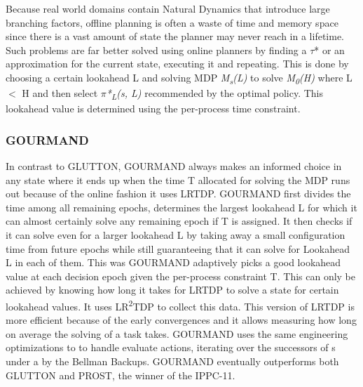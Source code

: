 \documentclass[runningheads,a4paper]{llncs}
\begin{document}
Because real world domains contain Natural Dynamics that introduce large branching factors, offline planning is often a waste of time and memory space since there is a vast amount of state the planner may never reach in a lifetime. Such problems are far better solved using online planners by finding a $\tau$* or an approximation for the current state, executing it and repeating. This is done by choosing a certain lookahead  L and solving MDP \emph{M\textsubscript{s}(L)} to solve \emph{M\textsubscript{0}(H)} where L $<$ H and then select \emph{$\pi$*\textsubscript{L}(s, L)} recommended by the optimal policy. This lookahead value is determined using the per-process time constraint.

\subsubsection{GOURMAND}
In contrast to GLUTTON, GOURMAND always makes an informed choice in any state where it ends up when the time T allocated for solving the MDP runs out because of the online fashion it uses LRTDP. GOURMAND first divides the time among all remaining epochs, determines the largest lookahead L for which it can almost certainly solve any remaining epoch if T is assigned.  It then checks if it can solve even for a larger lookahead L by taking away a small configuration time from future epochs  while still guaranteeing that it can solve for Lookahead L in each of them. This was GOURMAND adaptively picks a good lookahead value at each decision epoch given the per-process constraint T. This can only be achieved by knowing how long it takes for LRTDP to solve a state for certain lookahead values. It uses LR\textsuperscript{2}TDP to collect this data. This version of LRTDP is more efficient because of the early convergences and it allows measuring how long on average the solving of a task takes. GOURMAND uses the same engineering optimizations to to handle evaluate actions, iterating over the successors of s under a by the Bellman Backups. GOURMAND eventually outperforms both GLUTTON and PROST, the winner of the IPPC-11\cite{keller2012prost}.


\end{document}
